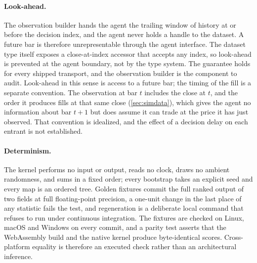 \paragraph{Look-ahead.} The observation builder hands the agent the trailing window of history at or before the decision index, and the agent never holds a handle to the dataset. A future bar is therefore unrepresentable through the agent interface. The dataset type itself exposes a close-at-index accessor that accepts any index, so look-ahead is prevented at the agent boundary, not by the type system. The guarantee holds for every shipped transport, and the observation builder is the component to audit. Look-ahead in this sense is access to a future bar; the timing of the fill is a separate convention. The observation at bar $t$ includes the close at $t$, and the order it produces fills at that same close (\cref{sec:simdata}), which gives the agent no information about bar $t+1$ but does assume it can trade at the price it has just observed. That convention is idealized, and the effect of a decision delay on each entrant is not established.

\paragraph{Determinism.} The kernel performs no input or output, reads no clock, draws no ambient randomness, and sums in a fixed order; every bootstrap takes an explicit seed and every map is an ordered tree. Golden fixtures commit the full ranked output of two fields at full floating-point precision, a one-unit change in the last place of any statistic fails the test, and regeneration is a deliberate local command that refuses to run under continuous integration. The fixtures are checked on Linux, macOS and Windows on every commit, and a parity test asserts that the WebAssembly build and the native kernel produce byte-identical scores. Cross-platform equality is therefore an executed check rather than an architectural inference.

